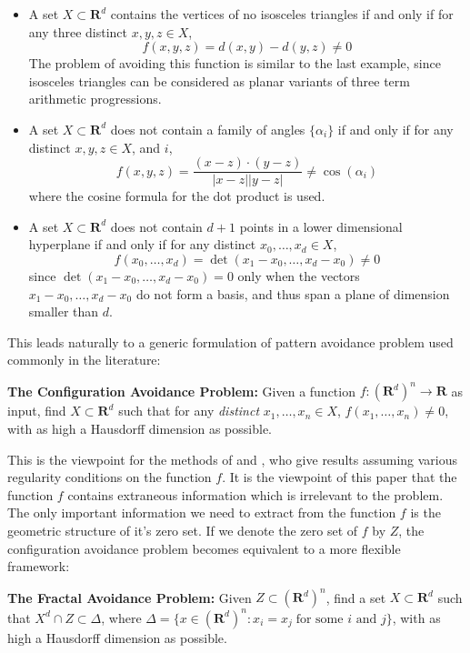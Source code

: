 \documentclass{article}
\theoremstyle{plain}
\theoremstyle{plain}
\begin{document}
\begin{multicols}{2}
\begin{itemize}
	\item A set $X \subset \mathbf{R}^d$ contains the vertices of no isosceles triangles if and only if for any three distinct $x,y,z \in X$,
	\[ f(x,y,z) = d(x,y) - d(y,z) \neq 0 \]
	The problem of avoiding this function is similar to the last example, since isosceles triangles can be considered as planar variants of three term arithmetic progressions.

	\item A set $X \subset \mathbf{R}^d$ does not contain a family of angles $\{ \alpha_i \}$ if and only if for any distinct $x,y,z \in X$, and $i$,
	\[ f(x,y,z) = \frac{(x - z) \cdot (y - z)}{|x - z||y - z|} \neq \cos(\alpha_i) \]
	where the cosine formula for the dot product is used.

	\item A set $X \subset \mathbf{R}^d$ does not contain $d+1$ points in a lower dimensional hyperplane if and only if for any distinct $x_0, \dots, x_d \in X$,
	\[ f(x_0, \dots, x_d) = \det(x_1 - x_0, \dots, x_d - x_0) \neq 0 \]
	since $\det(x_1 - x_0, \dots, x_d - x_0) = 0$ only when the vectors $x_1 - x_0, \dots, x_d - x_0$ do not form a basis, and thus span a plane of dimension smaller than $d$.
\end{itemize}
%
This leads naturally to a generic formulation of pattern avoidance problem used commonly in the literature:

\begin{changemargin}{0.5em}{0em}
{\bf The Configuration Avoidance Problem:} Given a function $f: (\mathbf{R}^d)^n \to \mathbf{R}$ as input, find $X \subset \mathbf{R}^d$ such that for any {\it distinct} $x_1, \dots, x_n \in X$, $f(x_1, \dots, x_n) \neq 0$, with as high a Hausdorff dimension as possible.
\end{changemargin}

This is the viewpoint for the methods of \cite{MalabikaRob} and \cite{Mathe}, who give results assuming various regularity conditions on the function $f$. It is the viewpoint of this paper that the function $f$ contains extraneous information which is irrelevant to the problem. The only important information we need to extract from the function $f$ is the geometric structure of it's zero set. If we denote the zero set of $f$ by $Z$, the configuration avoidance problem becomes equivalent to a more flexible framework:

\begin{changemargin}{0.5em}{0em}
	{\bf The Fractal Avoidance Problem:} Given $Z \subset (\mathbf{R}^d)^n$, find a set $X \subset \mathbf{R}^d$ such that $X^d \cap Z \subset \Delta$, where $\Delta = \{ x \in (\mathbf{R}^d)^n : x_i = x_j\; \text{for some $i$ and $j$} \}$, with as high a Hausdorff dimension as possible.
\end{changemargin}


\end{multicols}
\end{document}
